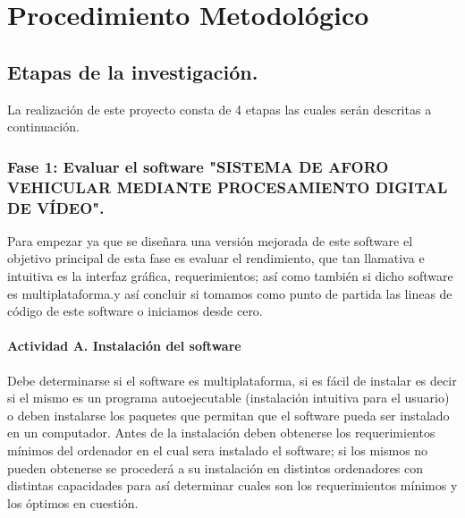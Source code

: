 
\chapter{Procedimiento Metodológico} %

\label{Capitulo3} %


\section{Etapas de la investigación.}
La realización de este proyecto consta de 4 etapas las cuales serán descritas a continuación. 


\subsection{Fase 1: Evaluar el software "SISTEMA DE AFORO VEHICULAR MEDIANTE PROCESAMIENTO DIGITAL DE VÍDEO".}


Para empezar ya que se diseñara una versión mejorada de este software el objetivo principal de esta fase es evaluar el rendimiento, que tan llamativa e intuitiva es la interfaz gráfica, requerimientos; así como también si dicho software es multiplataforma.y así concluir si tomamos como punto de partida las lineas de código de este software o iniciamos desde cero.

\subsubsection{Actividad A.  Instalación del software}

Debe determinarse si el software es multiplataforma, si es fácil de instalar es decir si el mismo es un programa autoejecutable (instalación intuitiva para el usuario) o deben instalarse los paquetes que permitan que el software pueda ser instalado en un computador. Antes de la instalación deben  obtenerse los requerimientos mínimos del ordenador en el cual sera instalado el software; si los mismos no pueden obtenerse se procederá a su instalación en distintos ordenadores con distintas capacidades para así determinar cuales son los requerimientos mínimos y los óptimos en cuestión.

